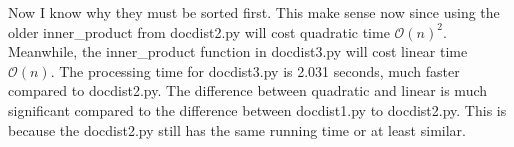 \documentclass{article}
\begin{document}
    Now I know why they must be sorted first. 
    This make sense now since using the older inner\_product from docdist2.py will cost quadratic time $\mathcal{O}(n)^2$.
    Meanwhile, the inner\_product function in docdist3.py will cost linear time $\mathcal{O}(n)$.
    The processing time for docdist3.py is 2.031 seconds, much faster compared to docdist2.py.
    The difference between quadratic and linear is much significant compared to the difference between docdist1.py to docdist2.py.
    This is because the docdist2.py still has the same running time or at least similar.
\end{document}
